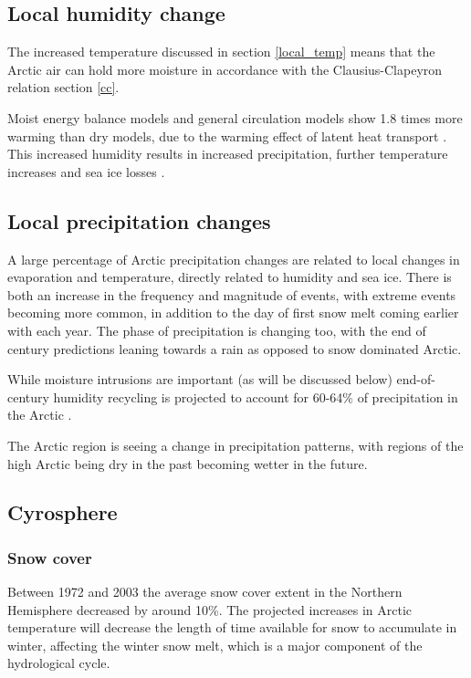 \documentclass[11pt, oneside]{article}
\begin{document}
\subsection{Local humidity change}
The increased temperature discussed in section \ref{local_temp} means that the Arctic air can hold more moisture in accordance with the Clausius-Clapeyron relation section \ref{cc}. 


Moist energy balance models and general circulation models show 1.8 times more warming than dry models, due to the warming effect of latent heat transport \cite{feldl2021polar}. This increased humidity results in increased precipitation, further temperature increases and sea ice losses \cite{mccrystall2021new}. 


\subsection{Local precipitation changes}
A large percentage of Arctic precipitation changes are related to local changes in evaporation and temperature, directly related to humidity and sea ice. There is both an increase in the frequency and magnitude of events, with extreme events becoming more common, in addition to the day of first snow melt coming earlier with each year. The phase of precipitation is changing too, with the end of century predictions leaning towards a rain as opposed to snow dominated Arctic. 


While moisture intrusions are important (as will be discussed below) end-of-century humidity recycling is projected to account for 60-64\% of precipitation in the Arctic \cite{ford2022arctic}.

The Arctic region is seeing a change in precipitation patterns, with regions of the high Arctic being dry in the past becoming wetter in the future. 



\subsection{Cyrosphere}
\subsubsection{Snow cover}
Between 1972 and 2003 the average snow cover extent in the Northern Hemisphere decreased by around 10\%. The projected increases in Arctic temperature will decrease the length of time available for snow to accumulate in winter, affecting the winter snow melt, which is a major component of the hydrological cycle. 
\end{document}
